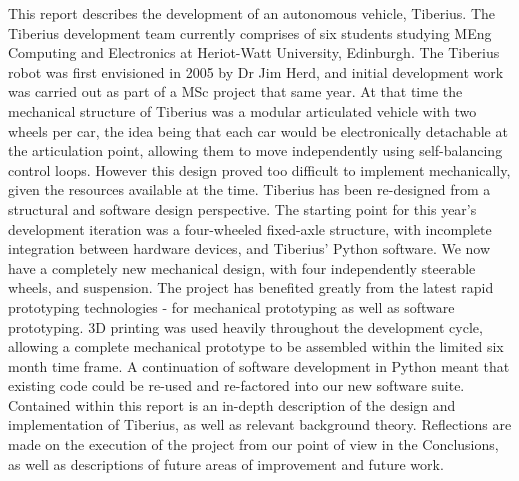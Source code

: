 This report describes the development of an autonomous vehicle, Tiberius. The Tiberius development team currently comprises of six students studying MEng Computing and Electronics at Heriot-Watt University, Edinburgh.
\newline
\newline
The Tiberius robot was first envisioned in 2005 by Dr Jim Herd, and initial development work was carried out as part of a MSc project that same year. At that time the mechanical structure of Tiberius was a modular articulated vehicle with two wheels per car, the idea being that each car would be electronically detachable at the articulation point, allowing them to move independently using self-balancing control loops. However this design proved too difficult to implement mechanically, given the resources available at the time.
\newline
\newline
Tiberius has been re-designed from a structural and software design perspective. The starting point for this year's development iteration was a four-wheeled fixed-axle structure, with incomplete integration between hardware devices, and Tiberius' Python software. We now have a completely new mechanical design, with four independently steerable wheels, and suspension.
\newline
\newline
The project has benefited greatly from the latest rapid prototyping technologies - for mechanical prototyping as well as software prototyping. 3D printing was used heavily throughout the development cycle, allowing a complete mechanical prototype to be assembled within the limited six month time frame. A continuation of software development in Python meant that existing code could be re-used and re-factored into our new software suite.
\newline
\newline
Contained within this report is an in-depth description of the design and implementation of Tiberius, as well as relevant background theory. Reflections are made on the execution of the project from our point of view in the Conclusions, as well as descriptions of future areas of improvement and future work.

\pagebreak
